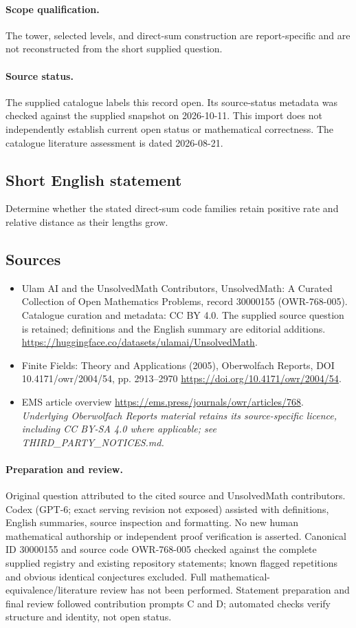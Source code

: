 \documentclass[11pt]{article}
\begin{document}
\paragraph{Scope qualification.}
The tower, selected levels, and direct-sum construction are report-specific and are not reconstructed from the short supplied question.
\paragraph{Source status.}
The supplied catalogue labels this record open. Its source-status metadata was checked against the supplied snapshot on 2026-10-11. This import does not independently establish current open status or mathematical correctness. The catalogue literature assessment is dated 2026-08-21.
\subsection{Short English statement}
Determine whether the stated direct-sum code families retain positive rate and relative distance as their lengths grow.
\subsection{Sources}
\begin{itemize}
\item[S1] Ulam AI and the UnsolvedMath Contributors, UnsolvedMath: A Curated Collection of Open Mathematics Problems, record 30000155 (OWR-768-005). Catalogue curation and metadata: CC BY 4.0. The supplied source question is retained; definitions and the English summary are editorial additions.
\url{https://huggingface.co/datasets/ulamai/UnsolvedMath}.
\item[S2] Finite Fields: Theory and Applications (2005), Oberwolfach Reports, DOI 10.4171/owr/2004/54, pp. 2913--2970
\url{https://doi.org/10.4171/owr/2004/54}.
\item[S3] EMS article overview
\url{https://ems.press/journals/owr/articles/768}.
\textit{Underlying Oberwolfach Reports material retains its source-specific licence, including CC BY-SA 4.0 where applicable; see THIRD\_PARTY\_NOTICES.md.}
\end{itemize}
\paragraph{Preparation and review.}
Original question attributed to the cited source and UnsolvedMath contributors. Codex (GPT-6; exact serving revision not exposed) assisted with definitions, English summaries, source inspection and formatting. No new human mathematical authorship or independent proof verification is asserted. Canonical ID 30000155 and source code OWR-768-005 checked against the complete supplied registry and existing repository statements; known flagged repetitions and obvious identical conjectures excluded. Full mathematical-equivalence/literature review has not been performed. Statement preparation and final review followed contribution prompts C and D; automated checks verify structure and identity, not open status.
\label{end:30000155}
\end{document}
